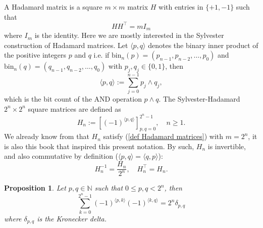 \documentclass{article}
\newtheorem{proposition}[theorem]{Proposition}
\begin{document}
A Hadamard matrix is a square $m \times m$ matrix $H$ with entries in $\{ +1, -1 \}$ such that
\begin{equation}
    \label{def Hadamard matrices}
    H H^{\top} = m I_m
\end{equation}
where $I_m$ is the identity. Here we are mostly interested in the Sylvester construction of Hadamard matrices. Let $\langle p, q\rangle$ denotes the binary inner product of the positive integers $p$ and $q$ i.e. if $\mathrm{bin}_n(p) = (p_{n-1}, p_{n-2},\ldots,p_0)$ and $\mathrm{bin}_n(q) = (q_{n-1}, q_{n-2},\ldots,q_0)$ with $p_j, q_j \in \{ 0,1 \}$, then
$$ \langle p,q\rangle := \sum_{j=0}^{n-1} p_j \wedge q_j, $$
which is the bit count of the AND operation $p \wedge q$. The Sylvester-Hadamard $2^n \times 2^n$ square matrices are defined as
\begin{equation}
    \label{def Sylvester Hadamard matrices}
    H_n := [(-1)^{\langle p,q\rangle}]_{p,q=0}^{2^n-1}, \quad n \geq 1.
\end{equation}
We already know from \cite{horadam} that $H_n$ satisfy (\ref{def Hadamard matrices}) with $m=2^n$, it is also this book that inspired this present notation. By such, $H_n$ is invertible, and also commutative by definition ($\langle p, q\rangle = \langle q, p \rangle$):
$$ H_n^{-1} = \frac{H_n}{2^n}, \quad H_n^{\top} = H_n. $$
\begin{proposition}
    \label{bit scalar product property}
    Let $p,q \in \mathbb{N}$ such that $0 \leq p,q < 2^n$, then
    $$ \sum_{k=0}^{2^n-1} (-1)^{\langle p,k \rangle} (-1)^{\langle k,q \rangle} = 2^n \delta_{p,q} $$
    where $\delta_{p,q}$ is the Kronecker delta.
\end{proposition}
\end{document}
